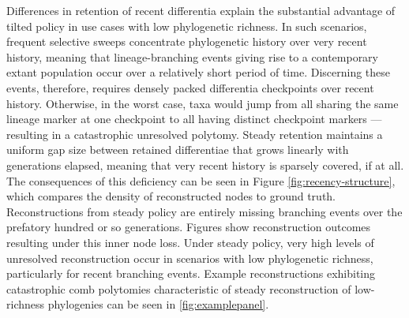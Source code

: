 Differences in retention of recent differentia explain the substantial advantage of tilted policy in use cases with low phylogenetic richness.
In such scenarios, frequent selective sweeps concentrate phylogenetic history over very recent history, meaning that lineage-branching events giving rise to a contemporary extant population occur over a relatively short period of time.
Discerning these events, therefore, requires densely packed differentia checkpoints over recent history.
Otherwise, in the worst case, taxa would jump from all sharing the same lineage marker at one checkpoint to all having distinct checkpoint markers --- resulting in a catastrophic unresolved polytomy.
Steady retention maintains a uniform gap size between retained differentiae that grows linearly with generations elapsed, meaning that very recent history is sparsely covered, if at all.
The consequences of this deficiency can be seen in Figure \ref{fig:recency-structure}, which compares the density of reconstructed nodes to ground truth.
Reconstructions from steady policy are entirely missing branching events over the prefatory hundred or so generations.
Figures  show reconstruction outcomes resulting under this inner node loss.
Under steady policy, very high levels of unresolved reconstruction occur in scenarios with low phylogenetic richness, particularly for recent branching events.
Example reconstructions exhibiting catastrophic comb polytomies characteristic of steady reconstruction of low-richness phylogenies can be seen in \ref{fig:examplepanel}.


% 


